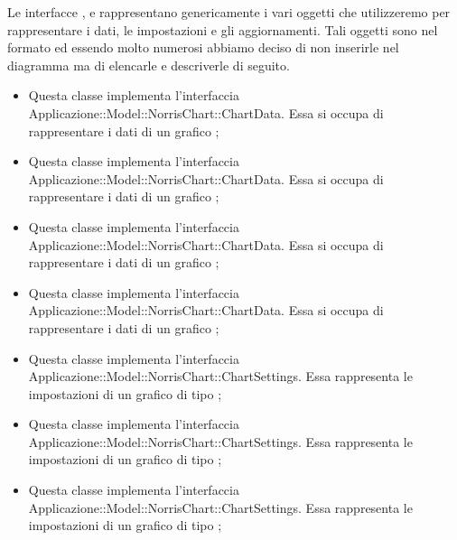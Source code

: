 	Le interfacce ,  \linebreak {} e  rappresentano genericamente i vari oggetti che utilizzeremo per rappresentare i dati, le impostazioni e gli aggiornamenti. Tali oggetti sono nel formato  ed essendo molto numerosi abbiamo deciso di non inserirle nel diagramma ma di elencarle e descriverle di seguito.

	\begin{itemize}
		\item {} Questa classe implementa l'interfaccia Applicazione::Model::NorrisChart::ChartData. Essa si occupa di rappresentare i dati di un grafico ;

		\item {} Questa classe implementa l'interfaccia Applicazione::Model::NorrisChart::ChartData. Essa si occupa di rappresentare i dati di un grafico ;

		\item {} Questa classe implementa l'interfaccia Applicazione::Model::NorrisChart::ChartData. Essa si occupa di rappresentare i dati di un grafico ;

		\item {} Questa classe implementa l'interfaccia Applicazione::Model::NorrisChart::ChartData. Essa si occupa di rappresentare i dati di un grafico ;

		\item {} Questa classe implementa l'interfaccia Applicazione::Model::NorrisChart::ChartSettings. Essa rappresenta le impostazioni di un grafico di tipo ;

		\item {} Questa classe implementa l'interfaccia Applicazione::Model::NorrisChart::ChartSettings. Essa rappresenta le impostazioni di un grafico di tipo ;

		\item {} Questa classe implementa l'interfaccia Applicazione::Model::NorrisChart::ChartSettings. Essa rappresenta le impostazioni di un grafico di tipo ;


\end{itemize}
